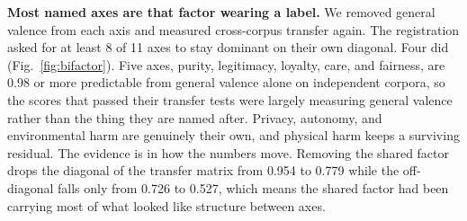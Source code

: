 \documentclass[journal]{IEEEtran}
\begin{document}
\textbf{Most named axes are that factor wearing a label.} We removed general
valence from each axis and measured cross-corpus transfer again. The
registration asked for at least 8 of 11 axes to stay dominant on their own
diagonal. Four did (Fig.~\ref{fig:bifactor}). Five axes, purity, legitimacy,
loyalty, care, and fairness, are 0.98 or more predictable from general
valence alone on independent corpora, so the scores that passed their
transfer tests were largely measuring general valence rather than the thing
they are named after. Privacy, autonomy, and environmental harm are genuinely
their own, and physical harm keeps a surviving residual. The evidence is in
how the numbers move. Removing the shared factor drops the diagonal of the
transfer matrix from 0.954 to 0.779 while the off-diagonal falls only from
0.726 to 0.527, which means the shared factor had been carrying most of what
looked like structure between axes.
\end{document}
